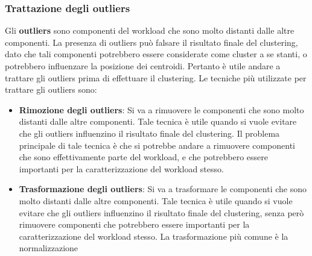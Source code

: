 \subsubsection{Trattazione degli outliers}
Gli \textbf{outliers} sono componenti del workload che sono molto distanti dalle altre componenti. La presenza di outliers può falsare il risultato finale del clustering, dato che tali componenti potrebbero essere considerate come cluster a se stanti, o potrebbero influenzare la posizione dei centroidi. Pertanto è utile andare a trattare gli outliers prima di effettuare il clustering. Le tecniche più utilizzate per trattare gli outliers sono:
\begin{itemize}
    \item \textbf{Rimozione degli outliers}: Si va a rimuovere le componenti che sono molto distanti dalle altre componenti. Tale tecnica è utile quando si vuole evitare che gli outliers influenzino il risultato finale del clustering. Il problema principale di tale tecnica è che si potrebbe andare a rimuovere componenti che sono effettivamente parte del workload, e che potrebbero essere importanti per la caratterizzazione del workload stesso.
    \item \textbf{Trasformazione degli outliers}: Si va a trasformare le componenti che sono molto distanti dalle altre componenti. Tale tecnica è utile quando si vuole evitare che gli outliers influenzino il risultato finale del clustering, senza però rimuovere componenti che potrebbero essere importanti per la caratterizzazione del workload stesso. La trasformazione più comune è la normalizzazione
\end{itemize}

